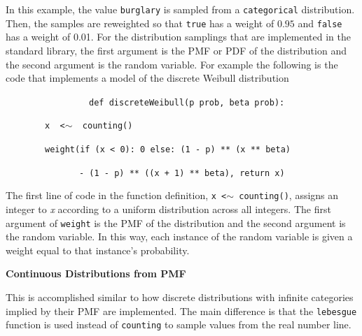 \documentclass[22pt]{beamer}
\newenvironment{variableblock}[3]{%
  \setbeamercolor{block body}{#2}
  \setbeamercolor{block title}{#3}
  \begin{block}{#1}}{\end{block}}
\begin{document}
\begin{frame}[fragile]
\begin{textblock}{5}
\begin{variableblock}{}{}{}
\tiny{In this example, the value {\tt \tiny{burglary}} is sampled from a {\tt \tiny{categorical}} distribution. Then, the samples are reweighted so that {\tt \tiny{true}} has a weight of $0.95$ and {\tt \tiny{false}} has a weight of 0.01. For the distribution samplings that are implemented in the standard library, the first argument is the PMF or PDF of the distribution and the second argument is the random variable. For example the following is the code that implements a model of the discrete Weibull distribution}

\begin{center}
\justifying
~~~~~~~~~~~~~~~~~\tt{\small{{\color{red}def} {\color{blue}discreteWeibull}(p {\color{green}prob}, beta {\color{green}prob}):}}

~~~~~~~~\tt{\small {x {\color{green} <$\sim$} {\color{blue} counting}()}}

~~~~~~~~\tt{\small{{\color{blue}weight}({\color{red}if} (x {\color{green}<} {\color{purple}0}):~{\color{purple}0} {\color{red}else}:~({\color{purple}1}~{\color{green}-}~p)~{\color{green}**}~(x~{\color{green}**}~beta) }}

~~~~~~~~~~~~~~~\tt{\small{{\color{green}-} ({\color{purple}1~}{\color{green}-}~p){\color{green}~**~}((x{\color{green}~+}{\color{purple}~1}){\color{green}~**~}beta), {\color{red}return} x)}}
\end{center}

\bigskip

\tiny{The first line of code in the function definition, {\tt \tiny{x <$\sim$ counting()}}, assigns an integer to \textit{x} according to a uniform distribution across all integers.
The first argument of {\tt \tiny{weight}} is the PMF of the distribution and the second argument is the random variable. In this way, each instance of the random variable is given a weight equal to that instance's probability.
}

\small{\textbf{Continuous Distributions from PMF}}

\bigskip

\tiny{This is accomplished similar to how discrete distributions with infinite categories implied by their PMF are implemented. The main difference is that the {\tt \tiny{lebesgue}} function is used instead of {\tt \tiny{counting}} to sample values from the real number line.}


\end{variableblock}



\end{textblock}
\end{frame}
\end{document}
